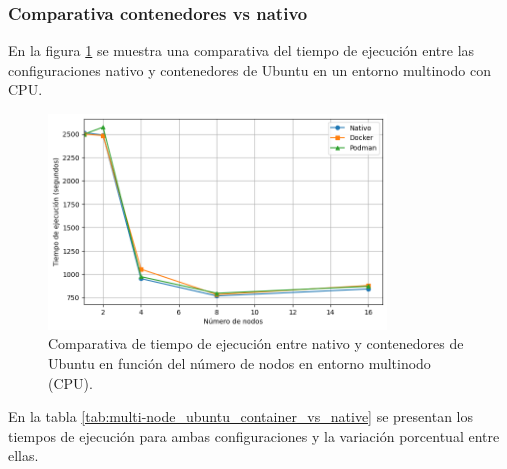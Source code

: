 \subsubsection{Comparativa contenedores vs nativo}

En la figura \ref{fig:multi-node_ubuntu_container_vs_native_time} se muestra una comparativa del tiempo de ejecución entre las configuraciones nativo y contenedores de Ubuntu en un entorno multinodo con CPU.

\begin{figure}[H]
    \centering
    \includegraphics[width=0.8\textwidth]{imagenes/cap5/multi-node_ubuntu_container_vs_native_time.png}
    \caption{Comparativa de tiempo de ejecución entre nativo y contenedores de Ubuntu en función del número de nodos en entorno multinodo (CPU).}
    \label{fig:multi-node_ubuntu_container_vs_native_time}
\end{figure}

En la tabla \ref{tab:multi-node_ubuntu_container_vs_native} se presentan los tiempos de ejecución para ambas configuraciones y la variación porcentual entre ellas.

